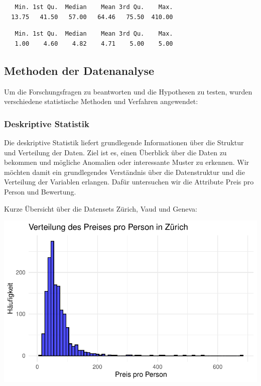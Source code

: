 \documentclass[
  journal,
]{IEEEtran}%
\begin{document}
\begin{verbatim}
   Min. 1st Qu.  Median    Mean 3rd Qu.    Max. 
  13.75   41.50   57.00   64.46   75.50  410.00 
\end{verbatim}

\begin{verbatim}
   Min. 1st Qu.  Median    Mean 3rd Qu.    Max. 
   1.00    4.60    4.82    4.71    5.00    5.00 
\end{verbatim}

\hypertarget{methoden-der-datenanalyse}{%
\subsection{Methoden der Datenanalyse}\label{methoden-der-datenanalyse}}

Um die Forschungsfragen zu beantworten und die Hypothesen zu testen,
wurden verschiedene statistische Methoden und Verfahren angewendet:

\hypertarget{deskriptive-statistik}{%
\subsubsection{\texorpdfstring{\textbf{Deskriptive
Statistik}}{Deskriptive Statistik}}\label{deskriptive-statistik}}

Die deskriptive Statistik liefert grundlegende Informationen über die
Struktur und Verteilung der Daten. Ziel ist es, einen Überblick über die
Daten zu bekommen und mögliche Anomalien oder interessante Muster zu
erkennen. Wir möchten damit ein grundlegendes Verständnis über die
Datenstruktur und die Verteilung der Variablen erlangen. Dafür
untersuchen wir die Attribute Preis pro Person und Bewertung.

Kurze Übersicht über die Datensets Zürich, Vaud und Geneva:

\includegraphics{main_files/figure-pdf/descriptive zurich-1.pdf}
\end{document}
